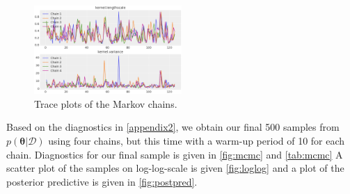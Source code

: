 \begin{figure}[H]
    \centering
    \includegraphics[width=0.5\textwidth]{src/traceplots.png}
    \caption{Trace plots of the Markov chains.}
    \label{fig:mcmc}
\end{figure}

\begin{table}[H]
\centering
{}
\caption[]{Diagnostics of MCMC samples generated by NUTS.}
\label{tab:mcmc}
\end{table}

Based on the diagnostics in \autoref{appendix2}, we obtain our final 500 samples from $p(\bm{\theta}|\mathcal{D})$ using four chains, but this time with a warm-up period of 10 for each chain. Diagnostics for our final sample is given in \autoref{fig:mcmc} and \autoref{tab:mcmc} A scatter plot of the samples on log-log-scale is given \autoref{fig:loglog} and a plot of the posterior predictive is given in \autoref{fig:postpred}.

